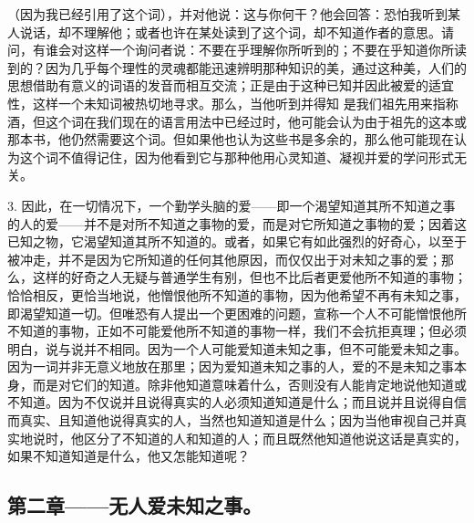 （因为我已经引用了这个词），并对他说：这与你何干？他会回答：恐怕我听到某人说话，却不理解他；或者也许在某处读到了这个词，却不知道作者的意思。请问，有谁会对这样一个询问者说：不要在乎理解你所听到的；不要在乎知道你所读到的？因为几乎每个理性的灵魂都能迅速辨明那种知识的美，通过这种美，人们的思想借助有意义的词语的发音而相互交流；正是由于这种已知并因此被爱的适宜性，这样一个未知词被热切地寻求。那么，当他听到并得知  是我们祖先用来指称酒，但这个词在我们现在的语言用法中已经过时，他可能会认为由于祖先的这本或那本书，他仍然需要这个词。但如果他也认为这些书是多余的，那么他可能现在认为这个词不值得记住，因为他看到它与那种他用心灵知道、凝视并爱的学问形式无关。\par

3. 因此，在一切情况下，一个勤学头脑的爱——即一个渴望知道其所不知道之事的人的爱——并不是对所不知道之事物的爱，而是对它所知道之事物的爱；因着这已知之物，它渴望知道其所不知道的。或者，如果它有如此强烈的好奇心，以至于被冲走，并不是因为它所知道的任何其他原因，而仅仅出于对未知之事的爱；那么，这样的好奇之人无疑与普通学生有别，但也不比后者更爱他所不知道的事物；恰恰相反，更恰当地说，他憎恨他所不知道的事物，因为他希望不再有未知之事，即渴望知道一切。但唯恐有人提出一个更困难的问题，宣称一个人不可能憎恨他所不知道的事物，正如不可能爱他所不知道的事物一样，我们不会抗拒真理；但必须明白，说与说并不相同。因为一个人可能爱知道未知之事，但不可能爱未知之事。因为一词并非无意义地放在那里；因为爱知道未知之事的人，爱的不是未知之事本身，而是对它们的知道。除非他知道意味着什么，否则没有人能肯定地说他知道或不知道。因为不仅说并且说得真实的人必须知道知道是什么；而且说并且说得自信而真实、且知道他说得真实的人，当然也知道知道是什么；因为当他审视自己并真实地说时，他区分了不知道的人和知道的人；而且既然他知道他说这话是真实的，如果不知道知道是什么，他又怎能知道呢？\par


\subsection{第二章——无人爱未知之事。}

